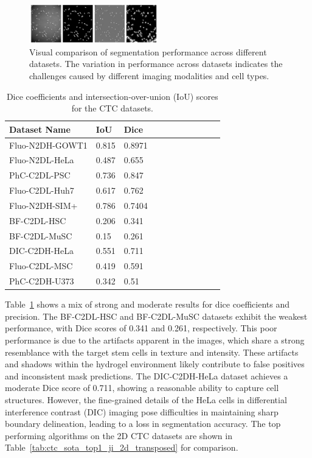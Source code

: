\documentclass[./dissertation.tex]{subfiles}
\begin{document}
\begin{figure}
    \includegraphics[width=0.5\textwidth]{./figures/cc/PhC-C2DL-PSC.png}
    \caption{Visual comparison of segmentation performance across different datasets. The variation in performance across datasets indicates the challenges caused by different imaging modalities and cell types.} \label{fig2}
\end{figure}


\begin{table}[ht]
    \caption{Dice coefficients and intersection-over-union (IoU) scores for the CTC datasets.}
    \label{tbl:iou_dice}
    \centering
    \begin{tabular}{|l|l|l|l|l|l|l|l|l|l|l|}
        \hline
        \textbf{Dataset Name} & \textbf{IoU} & \textbf{Dice} \\ \hline
        Fluo-N2DH-GOWT1       & 0.815        & 0.8971        \\ \hline
        Fluo-N2DL-HeLa        & 0.487        & 0.655         \\ \hline
        PhC-C2DL-PSC          & 0.736        & 0.847         \\ \hline
        Fluo-C2DL-Huh7        & 0.617        & 0.762         \\ \hline
        Fluo-N2DH-SIM+        & 0.786        & 0.7404        \\ \hline
        BF-C2DL-HSC           & 0.206        & 0.341         \\ \hline
        BF-C2DL-MuSC          & 0.15         & 0.261         \\ \hline
        DIC-C2DH-HeLa         & 0.551        & 0.711         \\ \hline
        Fluo-C2DL-MSC         & 0.419        & 0.591         \\ \hline
        PhC-C2DH-U373         & 0.342        & 0.51          \\ \hline
    \end{tabular}
\end{table}

Table~\ref{tbl:iou_dice} shows a mix of strong and moderate results for dice coefficients and precision. The BF-C2DL-HSC and BF-C2DL-MuSC datasets exhibit the weakest performance, with Dice scores of 0.341 and 0.261, respectively. This poor performance is due to the artifacts apparent in the images, which share a strong resemblance with the target stem cells in texture and intensity. These artifacts and shadows within the hydrogel environment likely contribute to false positives and inconsistent mask predictions. The DIC-C2DH-HeLa dataset achieves a moderate Dice score of 0.711, showing a reasonable ability to capture cell structures. However, the fine-grained details of the HeLa cells in differential interference contrast (DIC) imaging pose difficulties in maintaining sharp boundary delineation, leading to a loss in segmentation accuracy. The top performing algorithms on the 2D CTC datasets are shown in Table~\ref{tab:ctc_sota_top1_ji_2d_transposed} for comparison.
\end{document}

